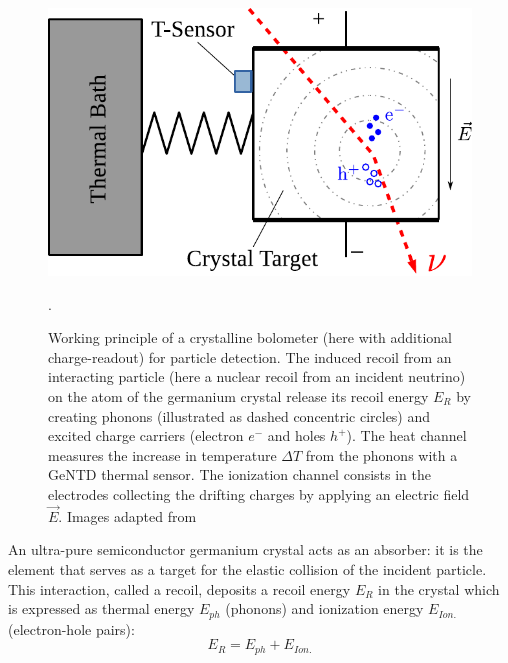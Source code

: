 \begin{figure}
\centering
\includegraphics[scale=1]{Figures/Experiment/crystalline_detector_principle.pdf}
\caption{Working principle of a crystalline bolometer (here with additional charge-readout) for particle detection. The induced recoil from an interacting particle (here a nuclear recoil from an incident neutrino) on the atom of the germanium crystal release its recoil energy $E_R$ by creating phonons (illustrated as dashed concentric circles) and excited charge carriers (electron $e^-$ and holes $h^+$). The heat channel measures the increase in temperature $\Delta T$ from the phonons with a GeNTD thermal sensor. The ionization channel consists in the electrodes collecting the drifting charges by applying an electric field $\vec{E}$.
 Images adapted from \cite{Schumann:2019eaa}}.
\label{fig:detector-principle}
\end{figure}

An ultra-pure semiconductor germanium crystal acts as an absorber: it is the element that serves as a target for the elastic collision of the incident particle. This interaction, called a recoil, deposits a recoil energy $E_R$ in the crystal which is expressed as thermal energy $E_{ph}$ (phonons) and ionization energy $E_{Ion.}$ (electron-hole pairs):
\begin{equation}
\label{energy}
E_R = E_{ph} + E_{Ion.}
\end{equation}

